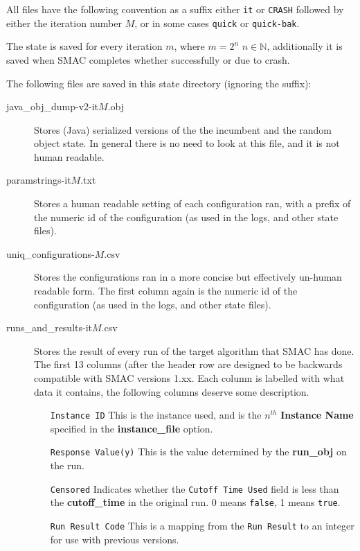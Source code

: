 \documentclass[manual.tex]{subfiles}
\begin{document}
All files have the following convention as a suffix either \texttt{it} or \texttt{CRASH} followed by either the iteration number $M$, or in some cases \texttt{quick} or \texttt{quick-bak}.

The state is saved for every iteration $m$, where $m=2^{n}$ $n \in \mathbb{N}$, additionally it is saved when SMAC completes whether successfully or due to crash.

The following files are saved in this state directory (ignoring the suffix):

\begin{description}
\item[java\_obj\_dump-v2-it$M$.obj] Stores (Java) serialized versions of the the incumbent and the random object state. In general there is no need to look at this file, and it is not human readable.

\item[paramstrings-it$M$.txt]	  Stores a human readable setting of each configuration ran, with a prefix of the numeric id of the configuration (as used in the logs, and other state files).

\item[uniq\_configurations-$M$.csv] Stores the configurations ran in a more concise but effectively un-human readable form. The first column again is the numeric id of the configuration (as used in the logs, and other state files).

\item[runs\_and\_results-it$M$.csv] Stores the result of every run of the target algorithm that SMAC has done. The first 13 columns (after the header row are designed to be backwards compatible with SMAC versions 1.xx. Each column is labelled with what data it contains, the following columns deserve some description.
	\begin{enumerate}
	\item[\texttt{Instance ID}]	This is the instance used, and is the $n^{th}$ \textbf{Instance Name} specified in the \textbf{instance\_file} option.
	\item[\texttt{Response Value(y)}]  This is the value determined by the \textbf{run\_obj} on the run.
	\item[\texttt{Censored}] Indicates whether the \texttt{Cutoff Time Used} field is less than the \textbf{cutoff\_time} in the original run. 0 means \texttt{false}, 1 means \texttt{true}.
	\item[\texttt{Run Result Code}]	This is a mapping from the \texttt{Run Result} to an integer for use with previous versions.
	\end{enumerate}
	

\end{description}
\end{document}
